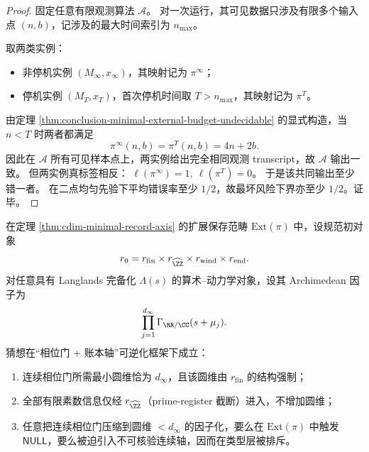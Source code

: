 \begin{proof}
固定任意有限观测算法 \(\mathcal A\)。
对一次运行，其可见数据只涉及有限多个输入点 \((n,b)\)，记涉及的最大时间索引为 \(n_{\max}\)。

取两类实例：
\begin{itemize}
  \item 非停机实例 \((M_\infty,x_\infty)\)，其映射记为 \(\pi^\infty\)；
  \item 停机实例 \((M_T,x_T)\)，首次停机时间取 \(T>n_{\max}\)，其映射记为 \(\pi^T\)。
\end{itemize}
由定理 \ref{thm:conclusion-minimal-external-budget-undecidable} 的显式构造，当 \(n<T\) 时两者都满足
\[
\pi^\infty(n,b)=\pi^T(n,b)=4n+2b.
\]
因此在 \(\mathcal A\) 所有可见样本点上，两实例给出完全相同观测 transcript，故 \(\mathcal A\) 输出一致。
但两实例真标签相反：
\(
\ell(\pi^\infty)=1,\ \ell(\pi^T)=0
\)。
于是该共同输出至少错一者。
在二点均匀先验下平均错误率至少 \(1/2\)，故最坏风险下界亦至少 \(1/2\)。证毕。
\end{proof}

\begin{conjecture}\label{conj:conclusion-cdim-langlands-gamma-minimal-alignment}
在定理 \ref{thm:cdim-minimal-record-axis} 的扩展保存范畴 \(\mathrm{Ext}(\pi)\) 中，设规范初对象
\[
r_0=r_{\mathrm{fin}}\times r_{\widehat{\ZZ}}\times r_{\mathrm{wind}}\times r_{\mathrm{end}}.
\]
对任意具有 Langlands 完备化 \(\Lambda(s)\) 的算术--动力学对象，设其 Archimedean 因子为
\[
\prod_{j=1}^{d_\infty}\Gamma_{\RR/\CC}(s+\mu_j).
\]
猜想在“相位门 + 账本轴”可逆化框架下成立：
\begin{enumerate}
  \item 连续相位门所需最小圆维恰为 \(d_\infty\)，且该圆维由 \(r_{\mathrm{fin}}\) 的结构强制；
  \item 全部有限素数信息仅经 \(r_{\widehat{\ZZ}}\)（prime-register 截断）进入，不增加圆维；
  \item 任意把连续相位门压缩到圆维 \(<d_\infty\) 的因子化，要么在 \(\mathrm{Ext}(\pi)\) 中触发 \(\mathsf{NULL}\)，要么被迫引入不可核验连续轴，因而在类型层被排斥。
\end{enumerate}
\end{conjecture}

\endinput

